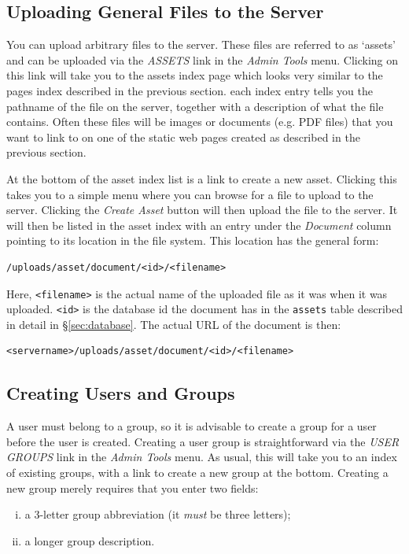 \documentclass[12pt]{article}
\begin{document}
\subsection{Uploading General Files to the Server}
You can upload arbitrary files to the server. These files are referred
to as `assets' and can be uploaded via the \emph{ASSETS} link in the
\emph{Admin Tools} menu. Clicking on this link will take you to the
assets index page which looks very similar to the pages index described
in the previous section.
each index entry tells you the pathname of the file on the server,
together with a description of what the file contains. Often these files
will be images or documents (e.g. PDF files) that you want to link to
on one of the static web pages created as described in the previous
section.

At the bottom of the asset index list is a link to create a new asset.
Clicking this takes you to a simple menu where you can browse for a file
to upload to the server. Clicking the \emph{Create Asset} button will
then upload the file to the server. It will then be listed in the
asset index with an entry under the \emph{Document} column pointing
to its location in the file system. This location has the general form:
\begin{verbatim}
/uploads/asset/document/<id>/<filename>
\end{verbatim}
Here, \verb=<filename>= is the actual name of the uploaded file as it was
when it was uploaded. \verb=<id>= is the database id the document has
in the \verb=assets= table described in detail in \S\ref{sec:database}.
The actual URL of the document is then:
\begin{verbatim}
<servername>/uploads/asset/document/<id>/<filename>
\end{verbatim}

\subsection{Creating Users and Groups}
A user must belong to a group, so it is advisable to create a group for a
user before the user is created. Creating a user group is straightforward
via the \emph{USER GROUPS} link in the \emph{Admin Tools} menu.
As usual, this will take you to an index of existing groups, with a link
to create a new group at the bottom. Creating a new group merely requires
that you enter two fields:
\begin{enumerate}[(i)]
\item
a 3-letter group abbreviation (it \emph{must} be three letters);
\item
a longer group description.
\end{enumerate}
\end{document}
